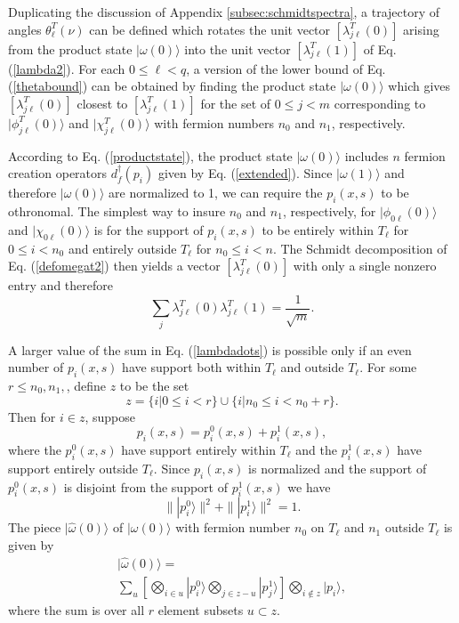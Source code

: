\documentclass[12pt,amsmath,amssymb,onecolumn]{revtex4-2}
\begin{document}
Duplicating the discussion of Appendix \ref{subsec:schmidtspectra}, a
trajectory of angles $\theta^T_\ell(\nu)$ can be defined which rotates
the unit vector $[ \lambda^T_{j\ell}(0) ]$ arising from the product
state $|\omega(0) \rangle $ into the unit vector $[\lambda^T_{j\ell}(1) ]$ of
Eq. (\ref{lambda2}). For each $0 \le \ell < q$, a version of
the lower bound of Eq. (\ref{thetabound}) can be obtained
by finding the product state $|\omega(0) \rangle $ which gives $[ \lambda^T_{j\ell}(0) ]$ 
closest to $[ \lambda^T_{j\ell}(1) ]$
for the set of $0 \le j < m$
corresponding to $|\phi^T_{j\ell}(0) \rangle $
and $|\chi^T_{j\ell}(0) \rangle $
with
fermion numbers $n_0$ and $n_1$, respectively.

According to Eq. (\ref{productstate}), the product state $|\omega(0) \rangle $ 
includes $n$ fermion creation operators
$ d^\dagger_f( p_i)$ given by
Eq. (\ref{extended}). Since $|\omega(1) \rangle $ and therefore $|\omega(0) \rangle $ are normalized
to 1, we can require the $p_i( x, s)$ 
to be othronomal.
The simplest way to insure $n_0$ and $n_1$, respectively,
for $|\phi_{0\ell}(0) \rangle $
and $|\chi_{0\ell}(0) \rangle $ is for the support of $p_i( x, s)$
to
be entirely within $T_\ell$ for $0 \le i < n_0$ and entirely
outside $T_\ell$ for $n_0 \le i < n$.
The Schmidt decomposition of Eq. (\ref{defomegat2}) then yields
a vector $[ \lambda^T_{j\ell}(0) ]$ with only a single nonzero
entry and therefore
\begin{equation}
  \label{lambdadots}
  \sum_j \lambda^T_{j \ell}(0) \lambda^T_{j \ell}(1) = \frac{1}{\sqrt{m}}.
\end{equation}


A larger value of the sum in Eq. (\ref{lambdadots}) is possible
only if an even number of $p_i(x,s)$ have support both within
$T_\ell$ and outside $T_\ell$.
For some $r \le n_0, n_1,$,
define $z$ to be the set
\begin{equation}
  \label{defsetz}
  z = \{ i | 0 \le i < r \} \cup  \{ i | n_0 \le i < n_0 + r \}.
\end{equation}
Then for $i \in z$, suppose
\begin{equation}
    \label{split0}
    p_i( x, s)  =  p^0_i( x, s) + p^1_i(x, s),
\end{equation}
where the $p^0_i( x, s)$ have support entirely within
$T_\ell$ and the $p^1_i( x, s)$ have support entirely
outside $T_\ell$. Since $p_i(x,s)$ is normalized and
the support of $p^0_i(x,s)$ is disjoint from
the support of $p^1_i(x,s)$ we have
\begin{equation}
  \label{splitnormalization}
  \parallel | p^0_i \rangle  \parallel^2 + \parallel | p^1_i \rangle  \parallel^2  = 1.
\end{equation}
The piece $|\hat{\omega}( 0) \rangle $  of $|\omega( 0) \rangle $ with fermion number
$n_0$ on $T_\ell$ and $n_1$ outside $T_\ell$ 
is given by
\begin{multline}
    \label{defpiecewithn0n1}
    |\hat{\omega}(0) \rangle  = \\
    \sum_u [\bigotimes_{i \in u} |p^0_i \rangle  \bigotimes_{ j \in z - u } |p^1_j \rangle  ]\bigotimes_{i \notin z} |p_i \rangle ,
\end{multline}
where the sum is over all $r$ element subsets $u \subset z$.
\end{document}
